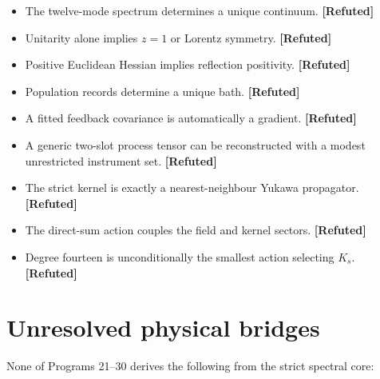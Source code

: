 \documentclass[11pt,a4paper,openany]{report}
\newcommand{\statusRefuted}{\textcolor{finred}{[Refuted]}}
\begin{document}
\begin{itemize}
\item 
The twelve-mode spectrum determines a unique continuum. \textbf{\statusRefuted{}}

\item 
Unitarity alone implies \(z=1\) or Lorentz symmetry. \textbf{\statusRefuted{}}

\item 
Positive Euclidean Hessian implies reflection positivity. \textbf{\statusRefuted{}}

\item 
Population records determine a unique bath. \textbf{\statusRefuted{}}

\item 
A fitted feedback covariance is automatically a gradient. \textbf{\statusRefuted{}}

\item 
A generic two-slot process tensor can be reconstructed with a modest unrestricted instrument set. \textbf{\statusRefuted{}}

\item 
The strict kernel is exactly a nearest-neighbour Yukawa propagator. \textbf{\statusRefuted{}}

\item 
The direct-sum action couples the field and kernel sectors. \textbf{\statusRefuted{}}

\item 
Degree fourteen is unconditionally the smallest action selecting \(K_s\). \textbf{\statusRefuted{}}

\end{itemize}

\section{Unresolved physical bridges}

None of Programs 21–30 derives the following from the strict spectral core:
\end{document}
